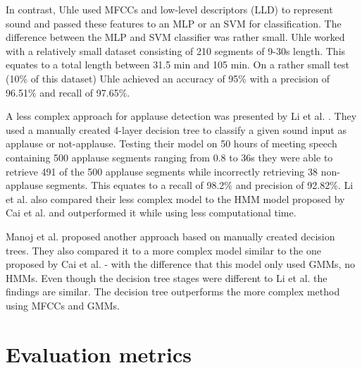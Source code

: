 \documentclass[bsc,frontabs,parskip,deptreport]{infthesis}
\begin{document}
In contrast, Uhle \citep{uhle2011applause} used MFCCs and low-level descriptors (LLD) to represent sound and passed these features to an MLP or an SVM for classification.
The difference between the MLP and SVM classifier was rather small.
Uhle worked with a relatively small dataset consisting of 210 segments of 9-30s length. This equates to a total length between 31.5 min and 105 min.
On a rather small test (10\% of this dataset) Uhle achieved an accuracy of 95\% with a precision of 96.51\% and recall of 97.65\%.

A less complex approach for applause detection was presented by Li et al. \citep{li2009characteristics}.
They used a manually created 4-layer decision tree to classify a given sound input as applause or not-applause.
Testing their model on 50 hours of meeting speech containing 500 applause segments ranging from 0.8 to 36s they were able to retrieve 491 of the 500 applause segments while incorrectly retrieving 38 non-applause segments.
This equates to a recall of 98.2\% and precision of 92.82\%. Li et al. also compared their less complex model to the HMM model proposed by Cai et al.\citep{cai2003highlight} and outperformed it while using less computational time.

Manoj et al. \citep{manoj2011novel} proposed another approach based on manually created decision trees. They also compared it to a more complex model similar to the one proposed by Cai et al. \citep{cai2003highlight} - with the difference that this model only used GMMs, no HMMs.
Even though the decision tree stages were different to Li et al. \citep{li2009characteristics} the findings are similar. The decision tree outperforms the more complex method using MFCCs and GMMs.  

\section{Evaluation metrics} \label{theory}
\end{document}
